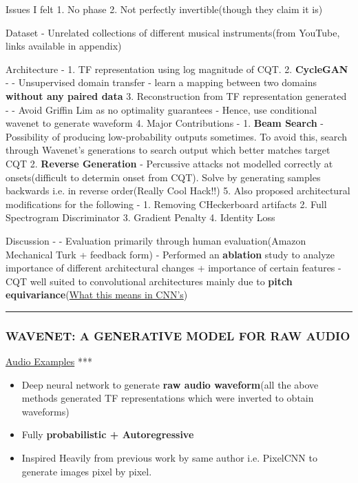 \documentclass[11pt]{article}
\providecommand{\tightlist}{%
      \setlength{\itemsep}{0pt}\setlength{\parskip}{0pt}}
\begin{document}
Issues I felt 1. No phase 2. Not perfectly invertible(though they claim
it is)

    Dataset - Unrelated collections of different musical instruments(from
YouTube, links available in appendix)

    Architecture - 1. TF representation using log magnitude of CQT. 2.
\textbf{CycleGAN} - - Unsupervised domain transfer - learn a mapping
between two domains \textbf{without any paired data} 3. Reconstruction
from TF representation generated - - Avoid Griffin Lim as no optimality
guarantees - Hence, use conditional wavenet to generate waveform 4.
Major Contributions - 1. \textbf{Beam Search} - Possibility of producing
low-probability outputs sometimes. To avoid this, search through
Wavenet's generations to search output which better matches target CQT
2. \textbf{Reverse Generation} - Percussive attacks not modelled
correctly at onsets(difficult to determin onset from CQT). Solve by
generating samples backwards i.e. in reverse order(Really Cool Hack!!)
5. Also proposed architectural modifications for the following - 1.
Removing CHeckerboard artifacts 2. Full Spectrogram Discriminator 3.
Gradient Penalty 4. Identity Loss

    Discussion - - Evaluation primarily through human evaluation(Amazon
Mechanical Turk + feedback form) - Performed an \textbf{ablation} study
to analyze importance of different architectural changes + importance of
certain features - CQT well suited to convolutional architectures mainly
due to \textbf{pitch
equivariance}(\href{https://www.quora.com/What-is-the-difference-between-equivariance-and-invariance-in-Convolution-neural-networks}{What
this means in CNN's})

    \begin{center}\rule{0.5\linewidth}{\linethickness}\end{center}

\subsubsection{WAVENET: A GENERATIVE MODEL FOR RAW
AUDIO}\label{wavenet-a-generative-model-for-raw-audio}

\href{https://deepmind.com/blog/wavenet-generative-model-raw-audio/}{Audio
Examples} ***

    \begin{itemize}
\tightlist
\item
  Deep neural network to generate \textbf{raw audio waveform}(all the
  above methods generated TF representations which were inverted to
  obtain waveforms)
\item
  Fully \textbf{probabilistic + Autoregressive}
\item
  Inspired Heavily from previous work by same author i.e. PixelCNN to
  generate images pixel by pixel.
\end{itemize}
\end{document}
